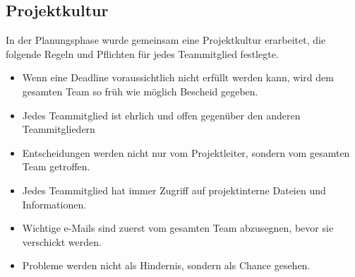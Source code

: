   \subsection{Projektkultur}
  In der Planungsphase wurde gemeinsam eine Projektkultur erarbeitet, die folgende Regeln und Pflichten
  für jedes Teammitglied festlegte.
  \begin{itemize}
    \item Wenn eine Deadline voraussichtlich nicht erfüllt werden kann, wird dem gesamten Team so früh wie möglich Bescheid gegeben.
    \item Jedes Teammitglied ist ehrlich und offen gegenüber den anderen Teammitgliedern
    \item Entscheidungen werden nicht nur vom Projektleiter, sondern vom gesamten Team getroffen.
    \item Jedes Teammitglied hat immer Zugriff auf projektinterne Dateien und Informationen.
    \item Wichtige e-Mails sind zuerst vom gesamten Team abzusegnen, bevor sie verschickt werden.
    \item Probleme werden nicht als Hindernis, sondern als Chance gesehen.
  \end{itemize}
